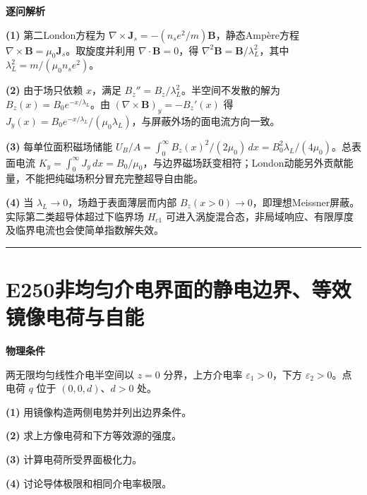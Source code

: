 \documentclass[UTF8,a4paper,11pt,oneside,openany]{ctexbook}
\begin{document}
\par\medskip\noindent\textbf{逐问解析}
\par\noindent\textbf{(1)} 第二London方程为 \(\nabla\times\boldsymbol J_s=-(n_se^2/m)\boldsymbol B\)，静态Ampère方程 \(\nabla\times\boldsymbol B=\mu_0\boldsymbol J_s\)。取旋度并利用 \(\nabla\cdot\boldsymbol B=0\)，得 \(\nabla^2\boldsymbol B=\boldsymbol B/\lambda_L^2\)，其中 \(\lambda_L^2=m/(\mu_0n_se^2)\)。
\par\noindent\textbf{(2)} 由于场只依赖 \(x\)，满足 \(B_z''=B_z/\lambda_L^2\)。半空间不发散的解为 \(B_z(x)=B_0e^{-x/\lambda_L}\)。由 \((\nabla\times\boldsymbol B)_y=-B_z'(x)\) 得 \(J_y(x)=B_0e^{-x/\lambda_L}/(\mu_0\lambda_L)\)，与屏蔽外场的面电流方向一致。
\par\noindent\textbf{(3)} 每单位面积磁场储能 \(U_B/A=\int_0^\infty B_z(x)^2/(2\mu_0)\,dx=B_0^2\lambda_L/(4\mu_0)\)。总表面电流 \(K_y=\int_0^\infty J_y\,dx=B_0/\mu_0\)，与边界磁场跃变相符；London动能另外贡献能量，不能把纯磁场积分冒充完整超导自由能。
\par\noindent\textbf{(4)} 当 \(\lambda_L\to0\)，场趋于表面薄层而内部 \(B_z(x>0)\to0\)，即理想Meissner屏蔽。实际第二类超导体超过下临界场 \(H_{c1}\) 可进入涡旋混合态，非局域响应、有限厚度及临界电流也会使简单指数解失效。

\par\bigskip\hrule\bigskip
\section*{E250\quad 非均匀介电界面的静电边界、等效镜像电荷与自能}
\textbf{物理条件}\par 两无限均匀线性介电半空间以 \(z=0\) 分界，上方介电率 \(\varepsilon_1>0\)，下方 \(\varepsilon_2>0\)。点电荷 \(q\) 位于 \((0,0,d)\)、\(d>0\) 处。
\par\noindent\textbf{(1)} 用镜像构造两侧电势并列出边界条件。
\par\noindent\textbf{(2)} 求上方像电荷和下方等效源的强度。
\par\noindent\textbf{(3)} 计算电荷所受界面极化力。
\par\noindent\textbf{(4)} 讨论导体极限和相同介电率极限。
\end{document}
